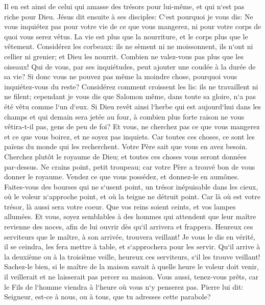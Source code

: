 \verse Il en est ainsi de celui qui amasse des trésors pour lui-même, et qui n`est pas riche pour Dieu. 
\verse Jésus dit ensuite à ses disciples: C`est pourquoi je vous dis: Ne vous inquiétez pas pour votre vie de ce que vous mangerez, ni pour votre corps de quoi vous serez vêtus. 
\verse La vie est plus que la nourriture, et le corps plus que le vêtement. 
\verse Considérez les corbeaux: ils ne sèment ni ne moissonnent, ils n`ont ni cellier ni grenier; et Dieu les nourrit. Combien ne valez-vous pas plus que les oiseaux! 
\verse Qui de vous, par ses inquiétudes, peut ajouter une coudée à la durée de sa vie? 
\verse Si donc vous ne pouvez pas même la moindre chose, pourquoi vous inquiétez-vous du reste? 
\verse Considérez comment croissent les lis: ils ne travaillent ni ne filent; cependant je vous dis que Salomon même, dans toute sa gloire, n`a pas été vêtu comme l`un d`eux. 
\verse Si Dieu revêt ainsi l`herbe qui est aujourd`hui dans les champs et qui demain sera jetée au four, à combien plus forte raison ne vous vêtira-t-il pas, gens de peu de foi? 
\verse Et vous, ne cherchez pas ce que vous mangerez et ce que vous boirez, et ne soyez pas inquiets. 
\verse Car toutes ces choses, ce sont les païens du monde qui les recherchent. Votre Père sait que vous en avez besoin. 
\verse Cherchez plutôt le royaume de Dieu; et toutes ces choses vous seront données par-dessus. 
\verse Ne crains point, petit troupeau; car votre Père a trouvé bon de vous donner le royaume. 
\verse Vendez ce que vous possédez, et donnez-le en aumônes. Faites-vous des bourses qui ne s`usent point, un trésor inépuisable dans les cieux, où le voleur n`approche point, et où la teigne ne détruit point. 
\verse Car là où est votre trésor, là aussi sera votre coeur. 
\verse Que vos reins soient ceints, et vos lampes allumées. 
\verse Et vous, soyez semblables à des hommes qui attendent que leur maître revienne des noces, afin de lui ouvrir dès qu`il arrivera et frappera. 
\verse Heureux ces serviteurs que le maître, à son arrivée, trouvera veillant! Je vous le dis en vérité, il se ceindra, les fera mettre à table, et s`approchera pour les servir. 
\verse Qu`il arrive à la deuxième ou à la troisième veille, heureux ces serviteurs, s`il les trouve veillant! 
\verse Sachez-le bien, si le maître de la maison savait à quelle heure le voleur doit venir, il veillerait et ne laisserait pas percer sa maison. 
\verse Vous aussi, tenez-vous prêts, car le Fils de l`homme viendra à l`heure où vous n`y penserez pas. 
\verse Pierre lui dit: Seigneur, est-ce à nous, ou à tous, que tu adresses cette parabole? 
